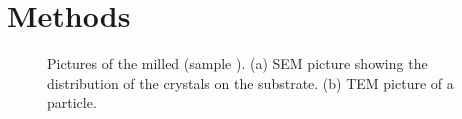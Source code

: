 
\section{Methods}	\label{sec::methods}

	\begin{figure}[tp]
		\begin{subfigure}[t]{ 0.49\linewidth}
			\centering
			\caption{}\label{subfig::sem}
		\end{subfigure}
		\hfill
		\begin{subfigure}[t]{ 0.49\linewidth}
			\centering
			\caption{}\label{subfig::tem}
		\end{subfigure}
		\caption{Pictures of the milled \nds (sample \insituH). (a) SEM picture showing the distribution of the \nd crystals on the substrate. (b) TEM picture of a \nd particle.}
		\label{fig::semtem}
	\end{figure}



